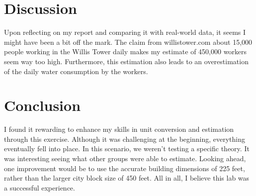 \documentclass{report}
\begin{document}
    \bigbreak \noindent 
    \section{Discussion}
    \bigbreak \noindent 
    Upon reflecting on my report and comparing it with real-world data, it seems I might have been a bit off the mark. The claim from willistower.com about 15,000 people working in the Willis Tower daily makes my estimate of 450,000 workers seem way too high. Furthermore, this estimation also leads to an overestimation of the daily water consumption by the workers. 

    \pagebreak \bigbreak \noindent 
    \section{Conclusion}
    \bigbreak \noindent 
    I found it rewarding to enhance my skills in unit conversion and estimation through this exercise. Although it was challenging at the beginning, everything eventually fell into place. In this scenario, we weren't testing a specific theory. It was interesting seeing what other groups were able to estimate. Looking ahead, one improvement would be to use the accurate building dimensions of 225 feet, rather than the larger city block size of 450 feet. All in all, I believe this lab was a successful experience.








    
\end{document}
